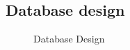 \documentclass{article}
\begin{document}

\subsection{Database design} 


\begin{figure}[H]
\capstart
	\centering
	\caption{Database Design\label{fig:database-design}}
\end{figure}








\end{document}
